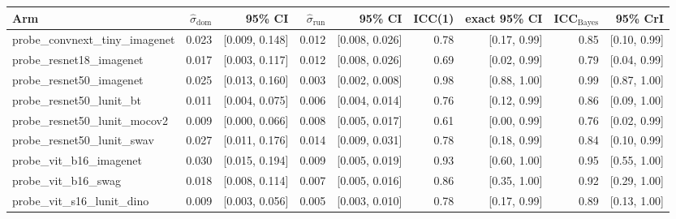 \begin{tabular}{lrrrrrrrr}
\toprule
Arm & $\hat\sigma_\text{dom}$ & 95\% CI & $\hat\sigma_\text{run}$ & 95\% CI & ICC(1) & exact 95\% CI & ICC$_\text{Bayes}$ & 95\% CrI \\
\midrule
probe\_convnext\_tiny\_imagenet & 0.023 & [0.009, 0.148] & 0.012 & [0.008, 0.026] & 0.78 & [0.17, 0.99] & 0.85 & [0.10, 0.99] \\
probe\_resnet18\_imagenet & 0.017 & [0.003, 0.117] & 0.012 & [0.008, 0.026] & 0.69 & [0.02, 0.99] & 0.79 & [0.04, 0.99] \\
probe\_resnet50\_imagenet & 0.025 & [0.013, 0.160] & 0.003 & [0.002, 0.008] & 0.98 & [0.88, 1.00] & 0.99 & [0.87, 1.00] \\
probe\_resnet50\_lunit\_bt & 0.011 & [0.004, 0.075] & 0.006 & [0.004, 0.014] & 0.76 & [0.12, 0.99] & 0.86 & [0.09, 1.00] \\
probe\_resnet50\_lunit\_mocov2 & 0.009 & [0.000, 0.066] & 0.008 & [0.005, 0.017] & 0.61 & [0.00, 0.99] & 0.76 & [0.02, 0.99] \\
probe\_resnet50\_lunit\_swav & 0.027 & [0.011, 0.176] & 0.014 & [0.009, 0.031] & 0.78 & [0.18, 0.99] & 0.84 & [0.10, 0.99] \\
probe\_vit\_b16\_imagenet & 0.030 & [0.015, 0.194] & 0.009 & [0.005, 0.019] & 0.93 & [0.60, 1.00] & 0.95 & [0.55, 1.00] \\
probe\_vit\_b16\_swag & 0.018 & [0.008, 0.114] & 0.007 & [0.005, 0.016] & 0.86 & [0.35, 1.00] & 0.92 & [0.29, 1.00] \\
probe\_vit\_s16\_lunit\_dino & 0.009 & [0.003, 0.056] & 0.005 & [0.003, 0.010] & 0.78 & [0.17, 0.99] & 0.89 & [0.13, 1.00] \\
\bottomrule
\end{tabular}
